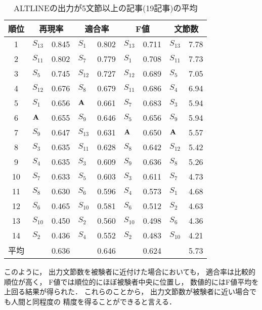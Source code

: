 \begin{table}[!htbp]
\begin{center}
\caption{ALTLINEの出力が5文節以上の記事(19記事)の平均}
\vspace{2mm}
\begin{tabular}{c|p{1.3mm}l|p{1.3mm}l|p{1.3mm}l|p{1.3mm}l}
\hline
順位 & \multicolumn{2}{c|}{再現率} & \multicolumn{2}{c|}{適合率} & 
 \multicolumn{2}{c|}{F値} & \multicolumn{2}{c}{文節数} \\
\hline
1  & $S_{13}$ &	0.845  & $S_{1}$  & 0.802  & $S_{13}$ & 0.711  & $S_{13}$ & 7.78 \\
2  & $S_{11}$ &	0.802  & $S_{7}$  & 0.779  & $S_{1}$  & 0.708  & $S_{11}$ & 7.73 \\
3  & $S_{5}$  &	0.745  & $S_{12}$ & 0.727  & $S_{12}$ & 0.689  & $S_{5}$  & 7.05 \\
4  & $S_{12}$ &	0.676  & $S_{8}$  & 0.679  & $S_{11}$ & 0.686  & $S_{4}$  & 6.94 \\
5  & $S_{1}$  &	0.656  & $\bf{A}$ & 0.661  & $S_{7}$  & 0.683  & $S_{3}$  & 5.94 \\
6  & $\bf{A}$ &	0.655  & $S_{9}$  & 0.646  & $S_{5}$  & 0.656  & $S_{9}$  & 5.94 \\
7  & $S_{9}$  &	0.647  & $S_{13}$ & 0.631  & $\bf{A}$ & 0.650  & $\bf{A}$ & 5.57 \\
8  & $S_{3}$  &	0.635  & $S_{11}$ & 0.628  & $S_{8}$  & 0.642  & $S_{12}$ & 5.42 \\
9  & $S_{4}$  &	0.635  & $S_{3}$  & 0.609  & $S_{9}$  & 0.636  & $S_{8}$  & 5.26 \\
10 & $S_{7}$  &	0.633  & $S_{5}$  & 0.603  & $S_{3}$  & 0.611  & $S_{7}$  & 4.73 \\
11 & $S_{8}$  &	0.630  & $S_{6}$  & 0.596  & $S_{4}$  & 0.573  & $S_{1}$  & 4.68 \\
12 & $S_{6}$  &	0.465  & $S_{10}$ & 0.581  & $S_{6}$  & 0.512  & $S_{2}$  & 4.63 \\
13 & $S_{10}$ &	0.450  & $S_{2}$  & 0.560  & $S_{10}$ & 0.498  & $S_{6}$  & 4.36 \\
14 & $S_{2}$  &	0.436  & $S_{4}$  & 0.552  & $S_{2}$  & 0.483  & $S_{10}$ & 4.21 \\
\hline
{\footnotesize 平均} & & 0.636 & & 0.646 & & 0.624 & & 5.73 \\
\hline
\end{tabular}
\end{center}
\end{table}

このように，
出力文節数を被験者に近付けた場合においても，
適合率は比較的順位が高く，
F値では順位的にほぼ被験者中央に位置し，
数値的にはF値平均を上回る結果が得られた．
これらのことから，
出力文節数が被験者に近い場合でも人間と同程度の
精度を得ることができると言える．

